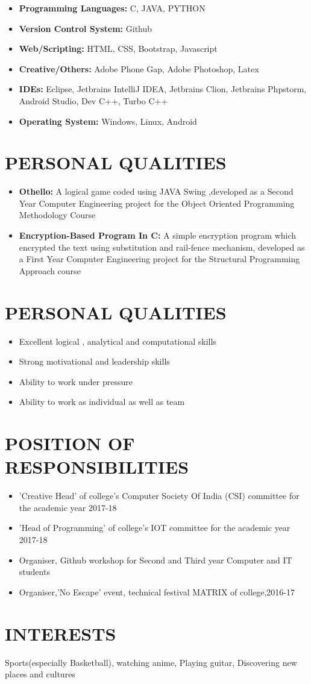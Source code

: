\documentclass[11pt]{article} %
\newcommand{\NewPart}[1]{\section*{\uppercase{#1}}}
\begin{document}
\begin{itemize}
\itemsep-0.5em 
\item \textbf{Programming Languages:} C, JAVA, PYTHON

\item \textbf{Version Control System:} Github
\vspace{0pt}

\item \textbf{Web/Scripting:} HTML, CSS, Bootstrap, Javascript
\item \textbf{Creative/Others:} Adobe Phone Gap, Adobe Photoshop, Latex

\item \textbf{IDEs:}  Eclipse, Jetbrains IntelliJ IDEA, Jetbrains Clion, Jetbrains Phpstorm, Android Studio, Dev C++, Turbo C++

\item \textbf{Operating System:} Windows, Linux, Android

\end{itemize}



\NewPart{    Personal Qualities}{}
\begin{itemize}
\itemsep-0.5em 
\item \textbf{Othello: }A logical game coded using JAVA Swing ,developed as a Second Year Computer Engineering project for the Object Oriented Programming Methodology Course 
\item \textbf{Encryption-Based Program In C: }A simple encryption program which encrypted the text using substitution and rail-fence mechanism, developed as a First Year Computer Engineering project for the Structural Programming Approach course
\end{itemize}


\NewPart{    Personal Qualities}{}

\begin{itemize}
\itemsep-0.5em 
\item Excellent logical , analytical and computational skills
\item Strong motivational and leadership skills
\item Ability to work under pressure 
\item Ability to work as individual as well as team 
\end{itemize}


\NewPart{  Position of Responsibilities}{}

\begin{itemize}
\itemsep-0.5em 
\item 'Creative Head' of college’s Computer Society Of India (CSI) committee for the academic year 2017-18
\item 'Head of Programming' of college’s IOT committee for the academic year 2017-18
\item Organiser, Github workshop for Second and Third year Computer and IT students 
\item Organiser,'No Escape' event, technical festival MATRIX of college,2016-17 
\end{itemize}

\NewPart{Interests}{}
Sports(especially Basketball), watching anime, Playing guitar, Discovering new places and cultures
\end{document}
